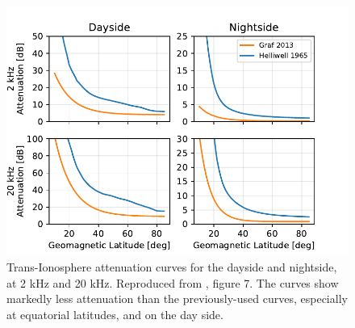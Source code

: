 \begin{figure}[h]
\begin{center}
\includegraphics{figures/iono_absorp_curves}
\caption[Trans-Ionosphere attenuation curves for day and night]{Trans-Ionosphere attenuation curves for the dayside and nightside, at 2 kHz and 20 kHz. Reproduced from \cite{Graf2013}, figure 7. The \citeauthor{Graf2013} curves show markedly less attenuation than the previously-used \citeauthor{Helliwell1965} curves, especially at equatorial latitudes, and on the day side.}
\label{fig:graf_curves}
\end{center}
\end{figure}